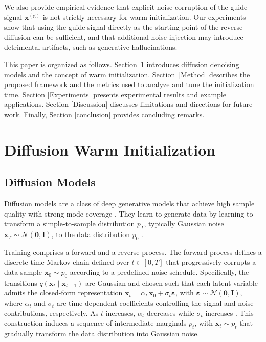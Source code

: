 We also provide empirical evidence that explicit noise corruption of the guide signal $\mathbf{x}^{(\mathrm g)}$ is not strictly necessary for warm initialization. Our experiments show that using the guide signal directly as the starting point of the reverse diffusion can be sufficient, and that additional noise injection may introduce detrimental artifacts, such as generative hallucinations.

This paper is organized as follows. Section~\ref{background} introduces diffusion denoising models and the concept of warm initialization. Section~\ref{Method} describes the proposed framework and the metrics used to analyze and tune the initialization time. Section \ref{Experiments} presents experimental results and example applications. Section \ref{Discussion} discusses limitations and directions for future work. Finally, Section \ref{conclusion} provides concluding remarks.

\section{Diffusion Warm Initialization}
\label{background}
\subsection{Diffusion Models}
Diffusion models are a class of deep generative models that achie\-ve high sample quality with strong mode coverage \cite{xiao2022tacklinggenerativelearningtrilemma}. They learn to generate data by learning to transform a simple-to-sample distribution $p_T$, typically Gaussian noise $\mathbf{x}_T \sim \mathcal{N}(\mathbf 0, \mathbf I)$, to the data distribution $p_0$ \cite{ho2020denoisingdiffusionprobabilisticmodels}.

Training comprises a forward and a reverse process.  The forward process defines a discrete-time Markov chain defined over $t \in [0,T]$ that progressively corrupts a data sample $\mathbf{x}_0 \sim p_0$ according to a predefined noise schedule. Specifically, the transitions $q(\mathbf{x}_t \mid \mathbf{x}_{t-1})$ are Gaussian and chosen such that each latent variable admits the closed-form representation
$\mathbf{x}_t = \alpha_t\, \mathbf{x}_0 + \sigma_t \boldsymbol \varepsilon $, with  $\boldsymbol  \varepsilon \sim \mathcal{N}(\mathbf 0, \mathbf I)$,
where $\alpha_t$ and $\sigma_t$ are time-dependent coefficients controlling the signal and noise contributions, respectively. As $t$ increases, $\alpha_t$ decreases while $\sigma_t$ increases \cite{ho2020denoisingdiffusionprobabilisticmodels, song2022denoisingdiffusionimplicitmodels}. This construction induces a sequence of intermediate marginals $p_t$, with $\mathbf{x}_t \sim p_t$ that gradually transform the data distribution into Gaussian noise.

